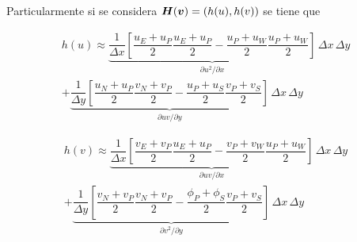 Particularmente si se considera $\boldsymbol{H}(\boldsymbol{v}) = (h(u),h(v))$ se tiene que 

\begin{equation}
\begin{split}
h(u) \approx \underbrace{ \dfrac{1}{\Delta x} \left[ \dfrac{u_E+u_P}{2} \dfrac{u_E+u_P}{2} - \dfrac{u_P+u_W}{2} \dfrac{u_P+u_W}{2} \right]}_{\partial u^2 / \partial x} \, \Delta x \, \Delta y  \\
+ \underbrace{ \dfrac{1}{\Delta y} \left[ \dfrac{u_N+u_P}{2} \dfrac{v_N+v_P}{2} - \dfrac{u_P+u_S}{2} \dfrac{v_P+v_S}{2} \right] }_{\partial uv / \partial y} \, \Delta x \, \Delta y
\end{split}
\end{equation}

\begin{equation}
\begin{split}
h(v) \approx \underbrace{ \dfrac{1}{\Delta x} \left[ \dfrac{v_E+v_P}{2} \dfrac{u_E+u_P}{2} - \dfrac{v_P+v_W}{2} \dfrac{u_P+u_W}{2} \right]}_{\partial uv / \partial x} \, \Delta x \, \Delta y \\
+ \underbrace{ \dfrac{1}{\Delta y} \left[ \dfrac{v_N+v_P}{2} \dfrac{v_N+v_P}{2} - \dfrac{\phi_P+\phi_S}{2} \dfrac{v_P+v_S}{2} \right] }_{\partial v^2 / \partial y} \, \Delta x \, \Delta y
\end{split}
\end{equation}
